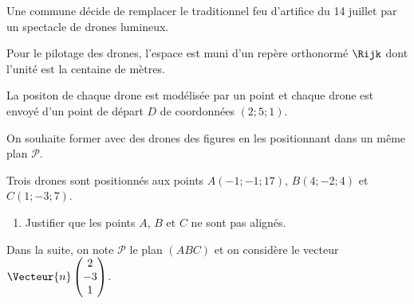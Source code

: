 Une commune décide de remplacer le traditionnel feu d'artifice du 14 juillet par un
spectacle de drones lumineux.

\smallskip

Pour le pilotage des drones, l'espace est muni d'un repère orthonormé $\Rijk$ dont l'unité est la centaine de mètres.

\smallskip

La positon de chaque drone est modélisée par un point et chaque drone est envoyé d'un point de départ $D$ de coordonnées $(2;5;1)$.

\smallskip

On souhaite former avec des drones des figures en les positionnant dans un même plan $\mathcal{P}$.

\smallskip

Trois drones sont positionnés aux points $A(-1;-1;17)$, $B(4;-2;4)$ et $C(1;-3;7)$.

\begin{enumerate}
	\item Justifier que les points $A$, $B$ et $C$ ne sont pas alignés.
\end{enumerate} 

Dans la suite, on note $\mathcal{P}$ le plan $(ABC)$ et on considère le vecteur $\Vecteur{n} \begin{pmatrix}2\\-3\\1\end{pmatrix}$.

